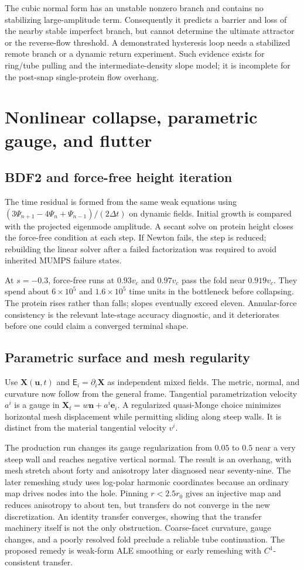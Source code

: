 The cubic normal form has an unstable nonzero branch and contains no stabilizing large-amplitude term. Consequently it predicts a barrier and loss of the nearby stable imperfect branch, but cannot determine the ultimate attractor or the reverse-flow threshold. A demonstrated hysteresis loop needs a stabilized remote branch or a dynamic return experiment. Such evidence exists for ring/tube pulling and the intermediate-density slope model; it is incomplete for the post-snap single-protein flow overhang.

\section{Nonlinear collapse, parametric gauge, and flutter}
\subsection{BDF2 and force-free height iteration}
The time residual is formed from the same weak equations using $(3\Psi_{n+1}-4\Psi_n+\Psi_{n-1})/(2\Delta t)$ on dynamic fields. Initial growth is compared with the projected eigenmode amplitude. A secant solve on protein height closes the force-free condition at each step. If Newton fails, the step is reduced; rebuilding the linear solver after a failed factorization was required to avoid inherited MUMPS failure states.

At $s=-0.3$, force-free runs at $0.93v_c$ and $0.97v_c$ pass the fold near $0.919v_c$. They spend about $6\times10^5$ and $1.6\times10^5$ time units in the bottleneck before collapsing. The protein rises rather than falls; slopes eventually exceed eleven. Annular-force consistency is the relevant late-stage accuracy diagnostic, and it deteriorates before one could claim a converged terminal shape.

\subsection{Parametric surface and mesh regularity}
Use $\bm X(\bm u,t)$ and $\mathsf E_i=\partial_i\bm X$ as independent mixed fields. The metric, normal, and curvature now follow from the general frame. Tangential parametrization velocity $a^i$ is a gauge in $\bm X_t=w\bm n+a^i\bm e_i$. A regularized quasi-Monge choice minimizes horizontal mesh displacement while permitting sliding along steep walls. It is distinct from the material tangential velocity $v^i$.

The production run changes its gauge regularization from $0.05$ to $0.5$ near a very steep wall and reaches negative vertical normal. The result is an overhang, with mesh stretch about forty and anisotropy later diagnosed near seventy-nine. The later remeshing study uses log-polar harmonic coordinates because an ordinary map drives nodes into the hole. Pinning $r<2.5r_0$ gives an injective map and reduces anisotropy to about ten, but transfers do not converge in the new discretization. An identity transfer converges, showing that the transfer machinery itself is not the only obstruction. Coarse-facet curvature, gauge changes, and a poorly resolved fold preclude a reliable tube continuation. The proposed remedy is weak-form ALE smoothing or early remeshing with $C^1$-consistent transfer.

